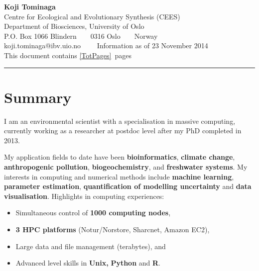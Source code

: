 \documentclass[11pt, a4paper]{article}
\begin{document}
\selectfont


\begin{center} {\LARGE \textbf{Koji Tominaga}}
  \\
  Centre for Ecological and Evolutionary Synthesis (CEES)\\
  Department of Biosciences, University of Oslo\\
  P.O. Box 1066 Blindern\ \ \textbullet \ \ 0316 Oslo\ \ \textbullet \
  \ Norway
  \\
  koji.tominaga@ibv.uio.no \ \ \textbullet \ \ Information as of 23
  November 2014 
  \\
  This document contains \ref{TotPages}~pages
\end{center}

\hrule
\vspace{-0.4em}



\section*{Summary}
I am an environmental scientist with a specialisation in massive
computing, currently working as a researcher at postdoc level after my
PhD completed in 2013.

My application fields to date have been \textbf{bioinformatics},
\textbf{climate change}, \textbf{anthropogenic pollution},
\textbf{biogeochemistry}, and \textbf{freshwater systems}. My
interests in computing and numerical methods include \textbf{machine
  learning}, \textbf{parameter estimation}, \textbf{quantification of
  modelling uncertainty} and \textbf{data visualisation}. Highlights
in computing experiences:
\begin{itemize}
  \itemsep-0.1em
\item Simultaneous control of \textbf{1000 computing nodes},
\item \textbf{3 HPC platforms} (Notur/Norstore, Sharcnet, Amazon EC2),
\item Large data and file management (terabytes), and
\item Advanced level skills in \textbf{Unix,} \textbf{Python} and
  \textbf{R}.
\end{itemize}









\end{document}
